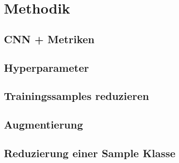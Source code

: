 \chapter{Methodik}

\section{CNN + Metriken}

\section{Hyperparameter}

\section{Trainingssamples reduzieren}

\section{Augmentierung}

\section{Reduzierung einer Sample Klasse}
